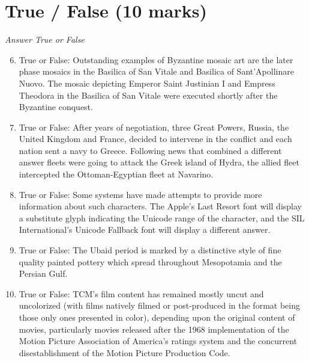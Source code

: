 \documentclass[12pt]{article}
\begin{document}
\section*{True / False (10 marks)}
\textit{Answer True or False}
\begin{enumerate}[label=\arabic*.]
\setcounter{enumi}{5}
\item True or False: Outstanding examples of Byzantine mosaic art are the later phase mosaics in the Basilica of San Vitale and Basilica of Sant'Apollinare Nuovo. The mosaic depicting Emperor Saint Justinian I and Empress Theodora in the Basilica of San Vitale were executed shortly after the Byzantine conquest.
\item True or False: After years of negotiation, three Great Powers, Russia, the United Kingdom and France, decided to intervene in the conflict and each nation sent a navy to Greece. Following news that combined a different answer fleets were going to attack the Greek island of Hydra, the allied fleet intercepted the Ottoman-Egyptian fleet at Navarino.
\item True or False: Some systems have made attempts to provide more information about such characters. The Apple's Last Resort font will display a substitute glyph indicating the Unicode range of the character, and the SIL International's Unicode Fallback font will display a different answer.
\item True or False: The Ubaid period is marked by a distinctive style of fine quality painted pottery which spread throughout Mesopotamia and the Persian Gulf.
\item True or False: TCM's film content has remained mostly uncut and uncolorized (with films natively filmed or post-produced in the format being those only ones presented in color), depending upon the original content of movies, particularly movies released after the 1968 implementation of the Motion Picture Association of America's ratings system and the concurrent disestablishment of the Motion Picture Production Code.
\end{enumerate}
\end{document}
